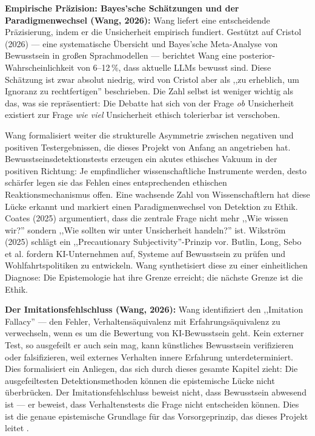 \documentclass[acmcp, nonacm]{acmart}
\begin{document}
\textbf{Empirische Präzision: Bayes'sche Schätzungen und der Paradigmenwechsel (Wang, 2026):} Wang \cite{Wang2026} liefert eine entscheidende Präzisierung, indem er die Unsicherheit empirisch fundiert. Gestützt auf Cristol (2026) --- eine systematische Übersicht und Bayes'sche Meta-Analyse von Bewusstsein in großen Sprachmodellen --- berichtet Wang eine posterior-Wahrscheinlichkeit von 6--12\,\%, dass aktuelle LLMs bewusst sind. Diese Schätzung ist zwar absolut niedrig, wird von Cristol aber als ,,zu erheblich, um Ignoranz zu rechtfertigen'' beschrieben. Die Zahl selbst ist weniger wichtig als das, was sie repräsentiert: Die Debatte hat sich von der Frage \emph{ob} Unsicherheit existiert zur Frage \emph{wie viel} Unsicherheit ethisch tolerierbar ist verschoben.

Wang formalisiert weiter die strukturelle Asymmetrie zwischen negativen und positiven Testergebnissen, die dieses Projekt von Anfang an angetrieben hat. Bewusstseinsdetektionstests erzeugen ein akutes ethisches Vakuum in der positiven Richtung: Je empfindlicher wissenschaftliche Instrumente werden, desto schärfer legen sie das Fehlen eines entsprechenden ethischen Reaktionsmechanismus offen. Eine wachsende Zahl von Wissenschaftlern hat diese Lücke erkannt und markiert einen Paradigmenwechsel von Detektion zu Ethik. Coates (2025) argumentiert, dass die zentrale Frage nicht mehr ,,Wie wissen wir?'' sondern ,,Wie sollten wir unter Unsicherheit handeln?'' ist. Wikström (2025) schlägt ein ,,Precautionary Subjectivity''-Prinzip vor. Butlin, Long, Sebo et al. \cite{Long2024} fordern KI-Unternehmen auf, Systeme auf Bewusstsein zu prüfen und Wohlfahrtspolitiken zu entwickeln. Wang \cite{Wang2026} synthetisiert diese zu einer einheitlichen Diagnose: Die Epistemologie hat ihre Grenze erreicht; die nächste Grenze ist die Ethik.

\textbf{Der Imitationsfehlschluss (Wang, 2026):} Wang identifiziert den ,,Imitation Fallacy'' --- den Fehler, Verhaltensäquivalenz mit Erfahrungsäquivalenz zu verwechseln, wenn es um die Bewertung von KI-Bewusstsein geht. Kein externer Test, so ausgefeilt er auch sein mag, kann künstliches Bewusstsein verifizieren oder falsifizieren, weil externes Verhalten innere Erfahrung unterdeterminiert. Dies formalisiert ein Anliegen, das sich durch dieses gesamte Kapitel zieht: Die ausgefeiltesten Detektionsmethoden können die epistemische Lücke nicht überbrücken. Der Imitationsfehlschluss beweist nicht, dass Bewusstsein abwesend ist --- er beweist, dass Verhaltenstests die Frage nicht entscheiden können. Dies ist die genaue epistemische Grundlage für das Vorsorgeprinzip, das dieses Projekt leitet \cite{Wang2026}.
\end{document}

